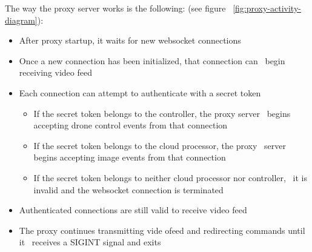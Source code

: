 The way the proxy server works is the following: (see figure ~\ref{fig:proxy-activity-diagram}):
\begin{itemize}
    \item After proxy startup, it waits for new websocket connections
    \item Once a new connection has been initialized, that connection can \
            begin receiving video feed
    \item Each connection can attempt to authenticate with a secret token
        \begin{itemize}
            \item If the secret token belongs to the controller, the proxy server \
                    begins accepting drone control events from that connection
            \item If the secret token belongs to the cloud processor, the proxy \
                    server begins accepting image events from that connection
            \item If the secret token belongs to neither cloud processor nor controller, \
                    it is invalid and the websocket connection is terminated
        \end{itemize}
    \item Authenticated connections are still valid to receive video feed
    \item The proxy continues transmitting vide ofeed and redirecting commands until it \
            receives a SIGINT signal and exits
\end{itemize}

